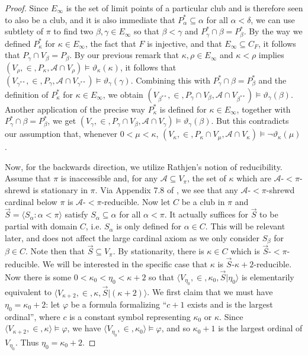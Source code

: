 \documentclass{article}
\theoremstyle{definition}
\theoremstyle{plain}
\theoremstyle{plain}
\theoremstyle{plain}
\theoremstyle{plain}
\theoremstyle{remark}
\theoremstyle{remark}
\theoremstyle{remark}
\theoremstyle{plain}
\theoremstyle{plain}
\theoremstyle{plain}
\begin{document}
\begin{proof}
Since $E_\infty$ is the set of limit points of a particular club and is therefore seen to also be a club, and it is also immediate that $P_\alpha^* \subseteq \alpha$ for all $\alpha < \delta$, we can use subtlety of $\pi$ to find two $\beta, \gamma \in E_\infty$ so that $\beta < \gamma$ and $P_\gamma^* \cap \beta = P_\beta^*$. By the way we defined $P_\kappa^*$ for $\kappa \in E_\infty$, the fact that $F$ is injective, and that $E_\infty \subseteq C_F$, it follows that $P_\gamma \cap V_\beta = P_\beta$. By our previous remark that $\kappa, \rho \in E_\infty$ and $\kappa < \rho$ implies $(V_\rho, \in, P_\kappa, \mathcal{A} \cap V_\rho) \models \vartheta_\kappa(\kappa)$, it follows that $(V_{\gamma^{**}}, \in, P_\gamma, \mathcal{A} \cap V_{\gamma^{**}}) \models \vartheta_\gamma(\gamma)$. Combining this with $P_\gamma^* \cap \beta = P_\beta^*$ and the definition of $P_\kappa^*$ for $\kappa \in E_\infty$, we obtain $(V_{\beta^{**}}, \in, P_\gamma \cap V_\beta, \mathcal{A} \cap V_{\beta^{**}}) \models \vartheta_\gamma(\beta)$. Another application of the precise way $P_\kappa^*$ is defined for $\kappa \in E_\infty$, together with $P_\gamma^* \cap \beta = P_\beta^*$, we get $(V_\gamma, \in, P_\gamma \cap V_\beta, \mathcal{A} \cap V_\gamma) \models \vartheta_\gamma(\beta)$. But this contradicts our assumption that, whenever $0 < \mu < \kappa$, $(V_\kappa, \in, P_\kappa \cap V_\mu, \mathcal{A} \cap V_\kappa) \models \neg \vartheta_\kappa(\mu)$.

Now, for the backwards direction, we utilize Rathjen's notion of reducibility. Assume that $\pi$ is inaccessible and, for any $\mathcal{A} \subseteq V_\pi$, the set of $\kappa$ which are $\mathcal{A}$-$< \pi$-shrewd is stationary in $\pi$. Via Appendix 7.8 of \cite{rathjen}, we see that any $\mathcal{A}$-$< \pi$-shrewd cardinal below $\pi$ is $\mathcal{A}$-$< \pi$-reducible. Now let $C$ be a club in $\pi$ and $\vec{S} = \langle S_\alpha: \alpha < \pi \rangle$ satisfy $S_\alpha \subseteq \alpha$ for all $\alpha < \pi$. It actually suffices for $\vec{S}$ to be partial with domain $C$, i.e. $S_\alpha$ is only defined for $\alpha \in C$. This will be relevant later, and does not affect the large cardinal axiom as we only consider $S_\beta$ for $\beta \in C$. Note then that $\vec{S} \subseteq V_\pi$. By stationarity, there is $\kappa \in C$ which is $\vec{S}$-$< \pi$-reducible. We will be interested in the specific case that $\kappa$ is $\vec{S}$-$\kappa + 2$-reducible. Now there is some $0 < \kappa_0 < \eta_0 < \kappa + 2$ so that $\langle V_{\eta_0}, \in, \kappa_0, \vec{S}|\eta_0 \rangle$ is elementarily equivalent to $\langle V_{\kappa+2}, \in, \kappa, \vec{S}|(\kappa + 2) \rangle$. We first claim that we must have $\eta_0 = \kappa_0+2$: let $\varphi$ be a formula formalizing ``$c+1$ exists and is the largest ordinal'', where $c$ is a constant symbol representing $\kappa_0$ or $\kappa$. Since $\langle V_{\kappa+2}, \in, \kappa \rangle \models \varphi$, we have $\langle V_{\eta_0}, \in, \kappa_0 \rangle \models \varphi$, and so $\kappa_0 + 1$ is the largest ordinal of $V_{\eta_0}$. Thus $\eta_0 = \kappa_0 + 2$.


\end{proof}
\end{document}
